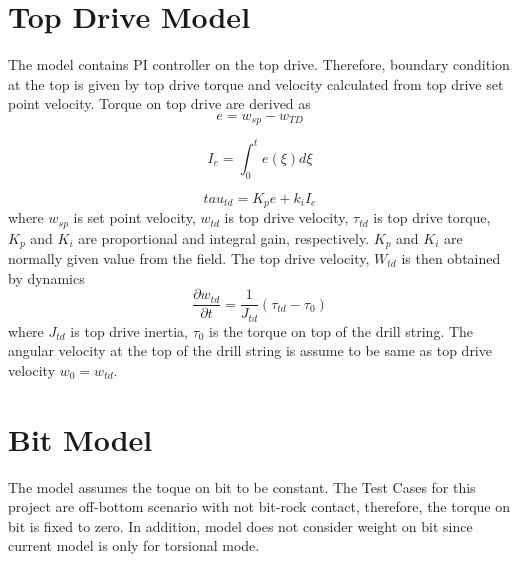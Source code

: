 \section{Top Drive Model}
The model contains PI controller on the top drive. Therefore, boundary condition at the top is given by top drive torque and velocity calculated from top drive set point velocity. Torque on top drive are derived as
\begin{equation}\label{AS_err}
  e = w_{sp} - w_{TD}
\end{equation}

\begin{equation}\label{AS_Ie}
  I_e = \int_{0}^{t}e(\xi)d\xi
\end{equation}

\begin{equation}\label{AS_tau_m}
  tau_{td} = K_pe + k_iI_e
\end{equation}
where $w_{sp}$ is set point velocity, $w_{td}$ is top drive velocity, $\tau_{td}$ is top drive torque, $K_p$ and $K_i$ are proportional and integral gain, respectively. $K_p$ and $K_i$ are normally given value from the field. The top drive velocity, $W_{td}$ is then obtained by dynamics
\begin{equation}\label{AS_w_td}
  \frac{\partial w_{td}}{\partial t} = \frac{1}{J_{td}}(\tau_{td} - \tau_0)
\end{equation}
where $J_{td}$ is top drive inertia, $\tau_{0}$ is the torque on top of the drill string. The angular velocity at the top of the drill string is assume to be same as top drive velocity $w_0 = w_{td}$.

\section{Bit Model}
The model assumes the toque on bit to be constant. The Test Cases for this project are off-bottom scenario with not bit-rock contact, therefore, the torque on bit is fixed to zero. In addition, model does not consider weight on bit since current model is only for torsional mode.

